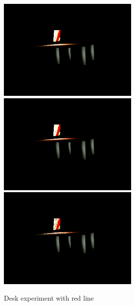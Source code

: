 \documentclass[twocolumn]{article}
\begin{document}
\begin{figure}[htbp]
    \centering
    \includegraphics[height=5cm]{img/desk-red-1.png}
    \includegraphics[height=5cm]{img/desk-red-2.png}
    \includegraphics[height=5cm]{img/desk-red-3.png}
    \caption{Desk experiment with red line}
    \label{fig:desk-red}
\end{figure}
\end{document}
